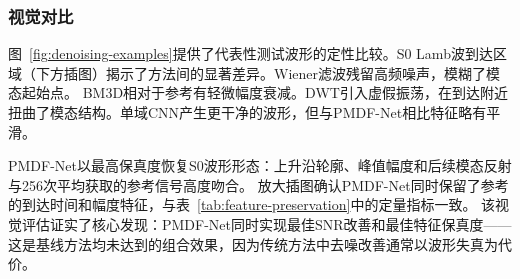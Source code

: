 \subsubsection{视觉对比}

图~\ref{fig:denoising-examples}提供了代表性测试波形的定性比较。S0 Lamb波到达区域（下方插图）揭示了方法间的显著差异。Wiener滤波残留高频噪声，模糊了模态起始点。
BM3D相对于参考有轻微幅度衰减。DWT引入虚假振荡，在到达附近扭曲了模态结构。单域CNN产生更干净的波形，但与PMDF-Net相比特征略有平滑。

PMDF-Net以最高保真度恢复S0波形形态：上升沿轮廓、峰值幅度和后续模态反射与256次平均获取的参考信号高度吻合。
放大插图确认PMDF-Net同时保留了参考的到达时间和幅度特征，与表~\ref{tab:feature-preservation}中的定量指标一致。
该视觉评估证实了核心发现：PMDF-Net同时实现最佳SNR改善和最佳特征保真度——这是基线方法均未达到的组合效果，因为传统方法中去噪改善通常以波形失真为代价。
